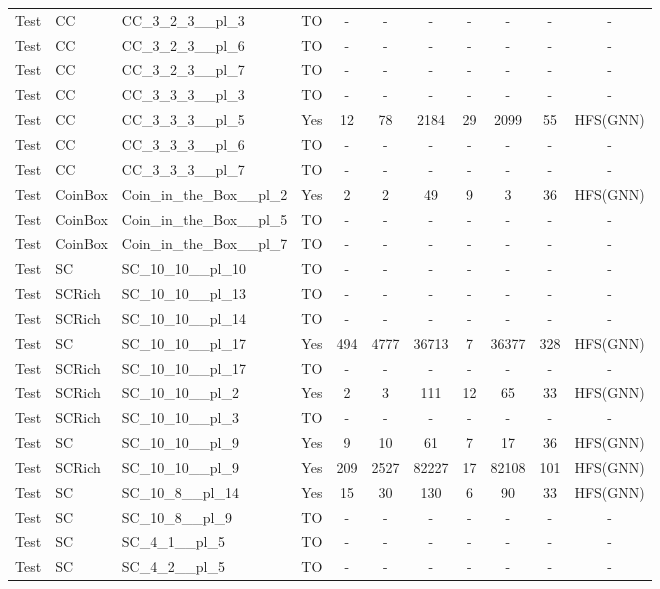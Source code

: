 \documentclass{article}
\begin{document}
\begin{tabular}{lllcccccccc}
Test & CC & CC\_3\_2\_3\_\_pl\_3 & TO & - & - & - & - & - & - & - \\
Test & CC & CC\_3\_2\_3\_\_pl\_6 & TO & - & - & - & - & - & - & - \\
Test & CC & CC\_3\_2\_3\_\_pl\_7 & TO & - & - & - & - & - & - & - \\
Test & CC & CC\_3\_3\_3\_\_pl\_3 & TO & - & - & - & - & - & - & - \\
Test & CC & CC\_3\_3\_3\_\_pl\_5 & Yes & 12 & 78 & 2184 & 29 & 2099 & 55 & HFS(GNN) \\
Test & CC & CC\_3\_3\_3\_\_pl\_6 & TO & - & - & - & - & - & - & - \\
Test & CC & CC\_3\_3\_3\_\_pl\_7 & TO & - & - & - & - & - & - & - \\
Test & CoinBox & Coin\_in\_the\_Box\_\_pl\_2 & Yes & 2 & 2 & 49 & 9 & 3 & 36 & HFS(GNN) \\
Test & CoinBox & Coin\_in\_the\_Box\_\_pl\_5 & TO & - & - & - & - & - & - & - \\
Test & CoinBox & Coin\_in\_the\_Box\_\_pl\_7 & TO & - & - & - & - & - & - & - \\
Test & SC & SC\_10\_10\_\_pl\_10 & TO & - & - & - & - & - & - & - \\
Test & SCRich & SC\_10\_10\_\_pl\_13 & TO & - & - & - & - & - & - & - \\
Test & SCRich & SC\_10\_10\_\_pl\_14 & TO & - & - & - & - & - & - & - \\
Test & SC & SC\_10\_10\_\_pl\_17 & Yes & 494 & 4777 & 36713 & 7 & 36377 & 328 & HFS(GNN) \\
Test & SCRich & SC\_10\_10\_\_pl\_17 & TO & - & - & - & - & - & - & - \\
Test & SCRich & SC\_10\_10\_\_pl\_2 & Yes & 2 & 3 & 111 & 12 & 65 & 33 & HFS(GNN) \\
Test & SCRich & SC\_10\_10\_\_pl\_3 & TO & - & - & - & - & - & - & - \\
Test & SC & SC\_10\_10\_\_pl\_9 & Yes & 9 & 10 & 61 & 7 & 17 & 36 & HFS(GNN) \\
Test & SCRich & SC\_10\_10\_\_pl\_9 & Yes & 209 & 2527 & 82227 & 17 & 82108 & 101 & HFS(GNN) \\
Test & SC & SC\_10\_8\_\_pl\_14 & Yes & 15 & 30 & 130 & 6 & 90 & 33 & HFS(GNN) \\
Test & SC & SC\_10\_8\_\_pl\_9 & TO & - & - & - & - & - & - & - \\
Test & SC & SC\_4\_1\_\_pl\_5 & TO & - & - & - & - & - & - & - \\
Test & SC & SC\_4\_2\_\_pl\_5 & TO & - & - & - & - & - & - & - \\

\end{tabular}
\end{document}
